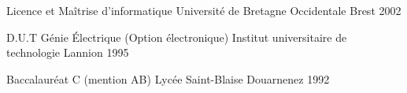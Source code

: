 

\begin{cventries}

  \cventry
    {Licence et Maîtrise d'informatique} %
    {Université de Bretagne Occidentale } %
    {Brest} %
    {2002} %
    {} %

  \cventry
    {D.U.T Génie Électrique (Option électronique)} %
    {Institut universitaire de technologie} %
    {Lannion} %
    {1995} %
    {}

  \cventry
    {Baccalauréat C (mention AB) } %
    {Lycée Saint-Blaise} %
    {Douarnenez} %
    {1992} %
    {}

\end{cventries}
